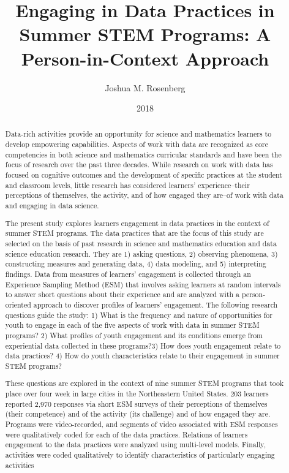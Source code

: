 \documentclass[]{msu-thesis}
\title{Engaging in Data Practices in Summer STEM Programs: A Person-in-Context Approach
}
\author{Joshua M. Rosenberg}
\date{2018}
\theoremstyle{definition}
\theoremstyle{definition}
\theoremstyle{definition}
\theoremstyle{remark}
\begin{document}

\maketitlepage
\begin{abstract}
Data-rich activities provide an opportunity for science and mathematics learners to develop empowering capabilities. Aspects of work with data are recognized as core competencies in both science and mathematics curricular standards and have been the focus of research over the past three decades. While research on work with data has focused on cognitive outcomes and the development of specific practices at the student and classroom levels, little research has considered learners' experience--their perceptions of themselves, the activity, and of how engaged they are--of work with data and engaging in data science.

The present study explores learners engagement in data practices in the context of summer STEM programs. The data practices that are the focus of this study are selected on the basis of past research in science and mathematics education and data science education research. They are 1) asking questions, 2) observing phenomena, 3) constructing measures and generating data, 4) data modeling, and 5) interpreting findings. Data from measures of learners' engagement is collected through an Experience Sampling Method (ESM) that involves asking learners at random intervals to answer short questions about their experience and are analyzed with a person-oriented approach to discover profiles of learners' engagement. The following research questions guide the study: 1) What is the frequency and nature of opportunities for youth to engage in each of the five aspects of work with data in summer STEM programs? 2) What profiles of youth engagement and its conditions emerge from experiential data collected in these programs?3) How does youth engagement relate to data practices? 4) How do youth characteristics relate to their engagement in summer STEM programs?

These questions are explored in the context of nine summer STEM programs that took place over four week in large cities in the Northeastern United States. 203 learners reported 2,970 responses via short ESM surveys of their perceptions of themselves (their competence) and of the activity (its challenge) and of how engaged they are. Programs were video-recorded, and segments of video associated with ESM responses were qualitatively coded for each of the data practices. Relations of learners engagement to the data practices were analyzed using multi-level models. Finally, activities were coded qualitatively to identify characteristics of particularly engaging activities


\end{abstract}
\end{document}
